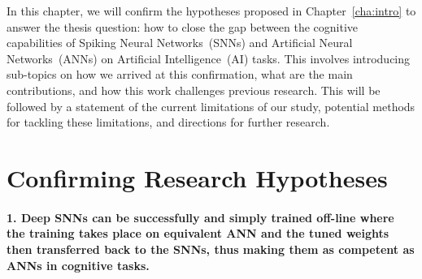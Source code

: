 

In this chapter, we will confirm the hypotheses proposed in Chapter~\ref{cha:intro} to answer the thesis question: how to close the gap between the cognitive capabilities of Spiking Neural Networks~(SNNs) and Artificial Neural Networks~(ANNs) on Artificial Intelligence~(AI) tasks.
This involves introducing sub-topics on how we arrived at this confirmation, what are the main contributions, and how this work challenges previous research.
This will be followed by a statement of the current limitations of our study, potential methods for tackling these limitations, and directions for further research.



\section{Confirming Research Hypotheses}
\paragraph{1. Deep SNNs can be successfully and simply trained off-line where the training takes place on equivalent ANN and the tuned weights then transferred back to the SNNs, thus making them as competent as ANNs in cognitive tasks.\\}

